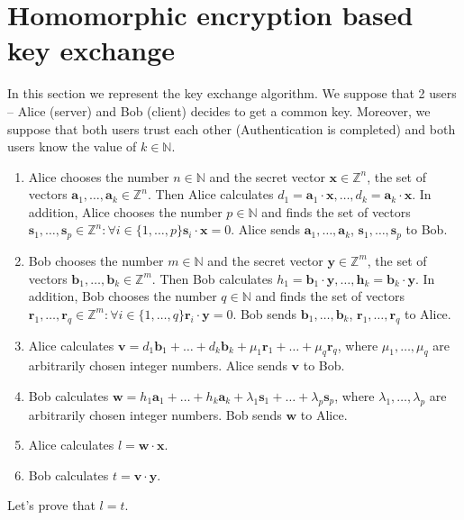 \section{Homomorphic encryption based key exchange}
	In this section we represent the key exchange algorithm. We suppose that 2 users -- Alice (server) and Bob (client) decides to get a common key. Moreover, we suppose that both users trust each other (Authentication is completed) and both users know the value of $ k \in \mathbb{N} $. 
	\begin{enumerate}
		\item Alice chooses the number $ n \in \mathbb{N} $ and the secret vector $ \textbf{x} \in \mathbb{Z}^n $, the set of vectors $ \textbf{a}_1, \dots, \textbf{a}_k \in \mathbb{Z}^n $. Then Alice calculates $ d_1 = \textbf{a}_1 \cdot \textbf{x}, \dots, d_k = \textbf{a}_k \cdot \textbf{x} $. In addition, Alice chooses the number $ p \in \mathbb{N} $ and finds the set of vectors $ \textbf{s}_1, \dots, \textbf{s}_p \in \mathbb{Z}^n : \forall i \in \{1, \dots, p\} \textbf{s}_i \cdot \textbf{x} = 0 $. Alice sends $ \textbf{a}_1, \dots, \textbf{a}_k $, $ \textbf{s}_1, \dots, \textbf{s}_p $ to Bob.
		\item Bob chooses the number $ m \in \mathbb{N} $ and the secret vector $ \textbf{y} \in \mathbb{Z}^m $, the set of vectors $ \textbf{b}_1, \dots, \textbf{b}_k \in \mathbb{Z}^m $. Then Bob calculates $ h_1 = \textbf{b}_1 \cdot \textbf{y}, \dots, \textbf{h}_k = \textbf{b}_k \cdot \textbf{y} $. In addition, Bob chooses the number $ q \in \mathbb{N} $ and finds the set of vectors $ \textbf{r}_1, \dots, \textbf{r}_q \in \mathbb{Z}^m : \forall i \in \{1, \dots, q\} \textbf{r}_i \cdot \textbf{y} = 0 $. Bob sends $ \textbf{b}_1, \dots, \textbf{b}_k $, $ \textbf{r}_1, \dots, \textbf{r}_q $ to Alice.
		\item Alice calculates $ \textbf{v} = d_1 \textbf{b}_1 + \dots + d_k \textbf{b}_k + \mu_1 \textbf{r}_1 + \dots + \mu_q \textbf{r}_q $, where $ \mu_1, \dots, \mu_q $ are arbitrarily chosen integer numbers. Alice sends $ \textbf{v} $ to Bob.
		\item Bob calculates $ \textbf{w} = h_1 \textbf{a}_1 + \dots + h_k \textbf{a}_k + \lambda_1 \textbf{s}_1 + \dots + \lambda_p \textbf{s}_p $, where $ \lambda_1, \dots, \lambda_p $ are arbitrarily chosen integer numbers. Bob sends $ \textbf{w} $ to Alice.
		\item Alice calculates $ l = \textbf{w} \cdot \textbf{x} $.
		\item Bob calculates $ t = \textbf{v} \cdot \textbf{y} $.
	\end{enumerate}
	Let's prove that $ l = t $.